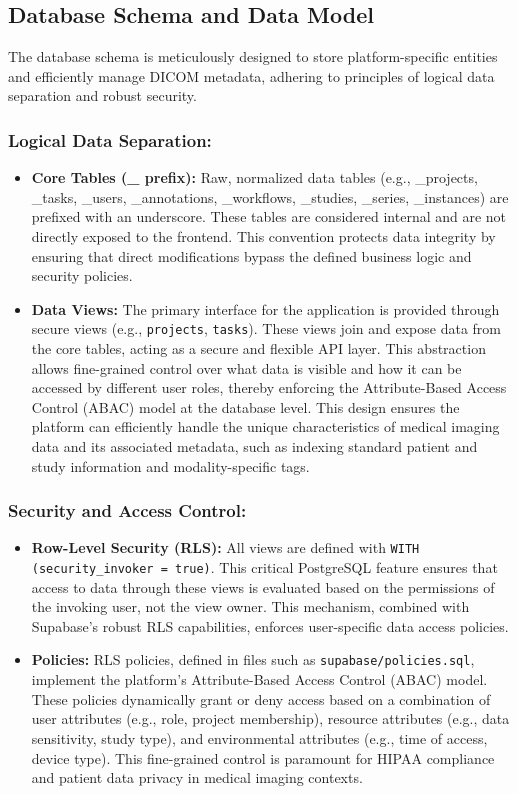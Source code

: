 \subsection{Database Schema and Data Model}

The database schema is meticulously designed to store platform-specific entities and efficiently manage DICOM metadata, adhering to principles of logical data separation and robust security.

\subsubsection*{Logical Data Separation:}
\begin{itemize}
    \item \textbf{Core Tables (\_ prefix):} Raw, normalized data tables (e.g., \_projects, \_tasks, \_users, \_annotations, \_workflows, \_studies, \_series, \_instances) are prefixed with an underscore. These tables are considered internal and are not directly exposed to the frontend. This convention protects data integrity by ensuring that direct modifications bypass the defined business logic and security policies.
    \item \textbf{Data Views:} The primary interface for the application is provided through secure views (e.g., \texttt{projects}, \texttt{tasks}). These views join and expose data from the core tables, acting as a secure and flexible API layer. This abstraction allows fine-grained control over what data is visible and how it can be accessed by different user roles, thereby enforcing the Attribute-Based Access Control (ABAC) model at the database level. This design ensures the platform can efficiently handle the unique characteristics of medical imaging data and its associated metadata, such as indexing standard patient and study information and modality-specific tags.
\end{itemize}

\subsubsection*{Security and Access Control:}
\begin{itemize}
    \item \textbf{Row-Level Security (RLS):} All views are defined with \texttt{WITH (security\_invoker = true)}. This critical PostgreSQL feature ensures that access to data through these views is evaluated based on the permissions of the invoking user, not the view owner. This mechanism, combined with Supabase's robust RLS capabilities, enforces user-specific data access policies.
    \item \textbf{Policies:} RLS policies, defined in files such as \texttt{supabase/policies.sql}, implement the platform's Attribute-Based Access Control (ABAC) model. These policies dynamically grant or deny access based on a combination of user attributes (e.g., role, project membership), resource attributes (e.g., data sensitivity, study type), and environmental attributes (e.g., time of access, device type). This fine-grained control is paramount for HIPAA compliance and patient data privacy in medical imaging contexts.
\end{itemize}

